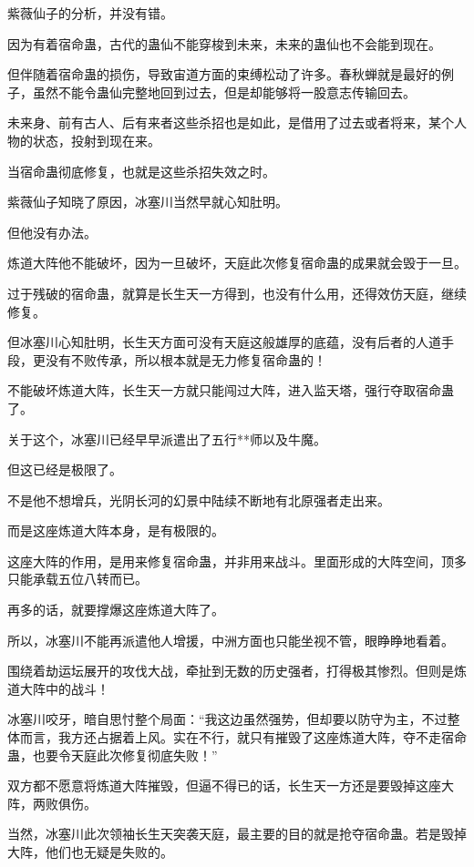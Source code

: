 
\begin{this_body}

紫薇仙子的分析，并没有错。

因为有着宿命蛊，古代的蛊仙不能穿梭到未来，未来的蛊仙也不会能到现在。

但伴随着宿命蛊的损伤，导致宙道方面的束缚松动了许多。春秋蝉就是最好的例子，虽然不能令蛊仙完整地回到过去，但是却能够将一股意志传输回去。

未来身、前有古人、后有来者这些杀招也是如此，是借用了过去或者将来，某个人物的状态，投射到现在来。

当宿命蛊彻底修复，也就是这些杀招失效之时。

紫薇仙子知晓了原因，冰塞川当然早就心知肚明。

但他没有办法。

炼道大阵他不能破坏，因为一旦破坏，天庭此次修复宿命蛊的成果就会毁于一旦。

过于残破的宿命蛊，就算是长生天一方得到，也没有什么用，还得效仿天庭，继续修复。

但冰塞川心知肚明，长生天方面可没有天庭这般雄厚的底蕴，没有后者的人道手段，更没有不败传承，所以根本就是无力修复宿命蛊的！

不能破坏炼道大阵，长生天一方就只能闯过大阵，进入监天塔，强行夺取宿命蛊了。

关于这个，冰塞川已经早早派遣出了五行**师以及牛魔。

但这已经是极限了。

不是他不想增兵，光阴长河的幻景中陆续不断地有北原强者走出来。

而是这座炼道大阵本身，是有极限的。

这座大阵的作用，是用来修复宿命蛊，并非用来战斗。里面形成的大阵空间，顶多只能承载五位八转而已。

再多的话，就要撑爆这座炼道大阵了。

所以，冰塞川不能再派遣他人增援，中洲方面也只能坐视不管，眼睁睁地看着。

围绕着劫运坛展开的攻伐大战，牵扯到无数的历史强者，打得极其惨烈。但则是炼道大阵中的战斗！

冰塞川咬牙，暗自思忖整个局面：“我这边虽然强势，但却要以防守为主，不过整体而言，我方还占据着上风。实在不行，就只有摧毁了这座炼道大阵，夺不走宿命蛊，也要令天庭此次修复彻底失败！”

双方都不愿意将炼道大阵摧毁，但逼不得已的话，长生天一方还是要毁掉这座大阵，两败俱伤。

当然，冰塞川此次领袖长生天突袭天庭，最主要的目的就是抢夺宿命蛊。若是毁掉大阵，他们也无疑是失败的。


\end{this_body}
